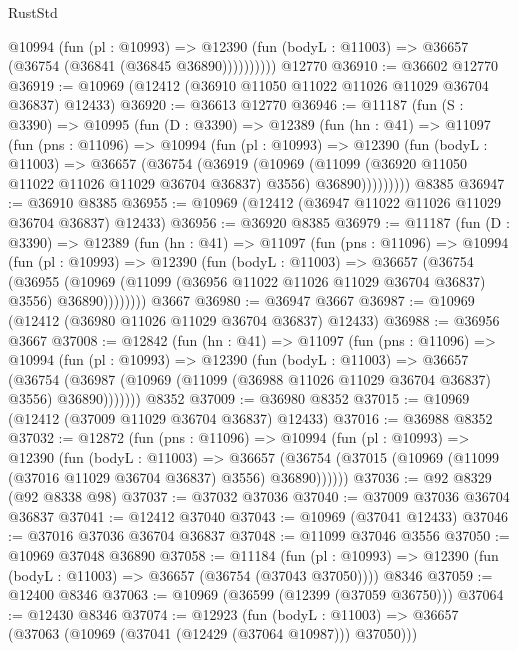 \begin{lexlean}{RustStd}
\begin{coremodule}
            @10994
              (fun (pl : @10993) =>
              @12390 (fun (bodyL : @11003) => @36657 (@36754 (@36841 (@36845 @36890))))))))))
    @12770
@36910 := @36602 @12770
@36919 := @10969 (@12412 (@36910 @11050 @11022 @11026 @11029 @36704 @36837) @12433)
@36920 := @36613 @12770
@36946 := @11187
    (fun (S : @3390) =>
    @10995
      (fun (D : @3390) =>
      @12389
        (fun (hn : @41) =>
        @11097
          (fun (pns : @11096) =>
          @10994
            (fun (pl : @10993) =>
            @12390
              (fun (bodyL : @11003) =>
              @36657
                (@36754
                  (@36919
                    (@10969
                      (@11099 (@36920 @11050 @11022 @11026 @11029 @36704 @36837) @3556)
                      @36890)))))))))
    @8385
@36947 := @36910 @8385
@36955 := @10969 (@12412 (@36947 @11022 @11026 @11029 @36704 @36837) @12433)
@36956 := @36920 @8385
@36979 := @11187
    (fun (D : @3390) =>
    @12389
      (fun (hn : @41) =>
      @11097
        (fun (pns : @11096) =>
        @10994
          (fun (pl : @10993) =>
          @12390
            (fun (bodyL : @11003) =>
            @36657
              (@36754
                (@36955
                  (@10969 (@11099 (@36956 @11022 @11026 @11029 @36704 @36837) @3556) @36890))))))))
    @3667
@36980 := @36947 @3667
@36987 := @10969 (@12412 (@36980 @11026 @11029 @36704 @36837) @12433)
@36988 := @36956 @3667
@37008 := @12842
    (fun (hn : @41) =>
    @11097
      (fun (pns : @11096) =>
      @10994
        (fun (pl : @10993) =>
        @12390
          (fun (bodyL : @11003) =>
          @36657
            (@36754
              (@36987 (@10969 (@11099 (@36988 @11026 @11029 @36704 @36837) @3556) @36890)))))))
    @8352
@37009 := @36980 @8352
@37015 := @10969 (@12412 (@37009 @11029 @36704 @36837) @12433)
@37016 := @36988 @8352
@37032 := @12872
    (fun (pns : @11096) =>
    @10994
      (fun (pl : @10993) =>
      @12390
        (fun (bodyL : @11003) =>
        @36657 (@36754 (@37015 (@10969 (@11099 (@37016 @11029 @36704 @36837) @3556) @36890))))))
@37036 := @92 @8329 (@92 @8338 @98)
@37037 := @37032 @37036
@37040 := @37009 @37036 @36704 @36837
@37041 := @12412 @37040
@37043 := @10969 (@37041 @12433)
@37046 := @37016 @37036 @36704 @36837
@37048 := @11099 @37046 @3556
@37050 := @10969 @37048 @36890
@37058 := @11184
    (fun (pl : @10993) => @12390 (fun (bodyL : @11003) => @36657 (@36754 (@37043 @37050))))
    @8346
@37059 := @12400 @8346
@37063 := @10969 (@36599 (@12399 (@37059 @36750)))
@37064 := @12430 @8346
@37074 := @12923
    (fun (bodyL : @11003) => @36657 (@37063 (@10969 (@37041 (@12429 (@37064 @10987))) @37050)))

\end{coremodule}
\end{lexlean}

